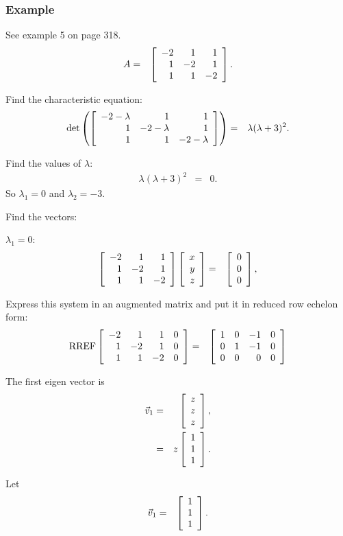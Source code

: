 \begin{frame}
  \frametitle{Example}

  See example 5 on page 318.
  \begin{eqnarray*}
    A & = & \left[ \begin{array}{rrr} -2 & 1 & 1 \\ 1 & -2 & 1 \\ 1 & 1 & -2 \end{array} \right].
  \end{eqnarray*}

  Find the characteristic equation:
  \begin{eqnarray*}
    \det\left(\left[ \begin{array}{rrr} -2-\lambda & 1 & 1 \\ 1 & -2-\lambda & 1 \\ 1 & 1 & -2-\lambda \end{array} \right]\right)
    & = & \lambda (\lambda+3)^2.
  \end{eqnarray*}

  Find the values of $\lambda$:
  \begin{eqnarray*}
    \lambda (\lambda+3)^2 & = & 0.
  \end{eqnarray*}
  So $\lambda_1 = 0$ and $\lambda_2=-3$.


\end{frame}


\begin{frame}
  Find the vectors:

  $\lambda_1 = 0$:
  \begin{eqnarray*}
    \left[ \begin{array}{rrr} -2 & 1 & 1 \\ 1 & -2 & 1 \\ 1 & 1 & -2 \end{array} \right]\left[ \begin{array}{r} x \\ y \\ z \end{array} \right] & = & \left[ \begin{array}{r} 0 \\ 0 \\ 0 \end{array} \right], \\
  \end{eqnarray*}

  Express this system in an augmented matrix and put it in reduced row
  echelon form:
  \begin{eqnarray*}
    \mathrm{RREF}\left[ \begin{array}{rrrr}
    -2 & 1 & 1 & 0 \\  
    1 & -2 & 1 & 0 \\ 
    1 & 1 & -2 & 0 \\ 
    \end{array} \right]
    & = & 
    \left[ \begin{array}{rrrr}
    1 & 0 & -1 & 0 \\  
    0 & 1 & -1 & 0 \\ 
    0 & 0 & 0 & 0 \\ 
    \end{array} \right]
  \end{eqnarray*}


\end{frame}

\begin{frame}
  The first eigen vector is 
  \begin{eqnarray*}
    \vec{v}_1 & = & \left[ \begin{array}{r} z \\ z \\ z \end{array} \right], \\
    & = & z \left[ \begin{array}{r} 1 \\ 1 \\ 1 \end{array} \right].
  \end{eqnarray*}

  Let
  \begin{eqnarray*}
    \vec{v}_1 & = & \left[ \begin{array}{r} 1 \\ 1 \\ 1 \end{array} \right].
  \end{eqnarray*}

\end{frame}

